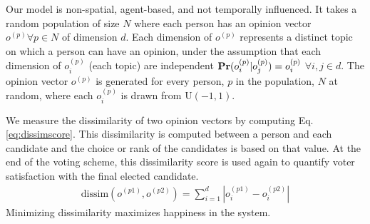 
Our model is non-spatial, agent-based, and not temporally influenced.
It takes a random population of size $N$ where each person has an opinion vector $o^{(p)} \forall p \in N$ of dimension $d$.
Each dimension of $o^{(p)}$ represents a distinct topic on which a person can have an opinion, under the assumption that each dimension of $o^{(p)}_i$ (each topic) are independent $\text{\bf Pr}(o^{(p)}_i | o^{(p)}_j) = o^{(p)}_i $  $\forall i,j \in d$.
The opinion vector $o^{(p)}$ is generated for every person, $p$ in the population, $N$ at random, where each $o^{(p)}_i$ is drawn from U$(-1,1)$.

We measure the dissimilarity of two opinion vectors by computing Eq. \ref{eq:dissimscore}.
This dissimilarity is computed between a person and each candidate and the choice or rank of the candidates is based on that value.
At the end of the voting scheme, this dissimilarity score is used again to quantify voter satisfaction with the final elected candidate.
\begin{align}
\text{dissim}(o^{(p1)},o^{(p2)}) = \sum_{i=1}^{d}|o^{(p1)}_i - o^{(p2)}_i|
\label{eq:dissimscore}
\end{align}
Minimizing dissimilarity maximizes happiness in the system.

